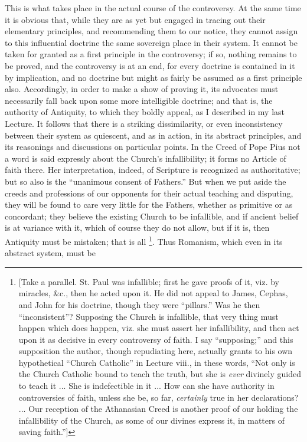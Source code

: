 This is what takes place in the actual course of the controversy.
At the same time it is obvious that, while they are as yet but engaged
in tracing out their elementary principles, and recommending them to
our notice, they cannot assign to this influential doctrine the same
sovereign place in their system. It cannot be taken for granted as a
first principle in the controversy; if so, nothing remains to be
proved, and the controversy is at an end, for every doctrine is
contained in it by implication, and no doctrine but might as fairly be
assumed as a first principle also. Accordingly, in order to make a
show of proving it, its advocates must necessarily fall back upon some
more intelligible doctrine; and that is, the authority of Antiquity,
to which they boldly appeal, as I described in my last Lecture. It
follows that there is a striking dissimilarity, or even inconsistency
between their system as quiescent, and as in action, in its abstract
principles, and its reasonings and discussions on particular points.
In the Creed of Pope Pius not a word is said expressly about the
Church's infallibility; it forms no Article of faith there. Her
interpretation, indeed, of Scripture is recognized as authoritative;
but so also is the ``unanimous consent of Fathers.'' But when
we put aside the creeds and professions of our opponents for their
actual teaching and disputing, they will be found to care very little
for the Fathers, whether as primitive or as concordant; they believe
the existing Church to be infallible, and if ancient belief is at
variance with it, which of course they do not allow, but if it is,
then Antiquity must be mistaken; that is all \footnote{[Take a parallel. St. Paul was infallible;
first he gave proofs of it, viz. by miracles, \&c., then he acted
upon it. He did not appeal to James, Cephas, and John for his
doctrine, though they were ``pillars.'' Was he then
``inconsistent''? Supposing the Church is infallible, that
very thing must happen which does happen, viz. she must assert her
infallibility, and then act upon it as decisive in every controversy
of faith. I say ``supposing;'' and this supposition the
author, though repudiating here, actually grants to his own
hypothetical ``Church Catholic'' in Lecture viii., in these
words, ``Not only is the Church Catholic bound to teach the truth,
but she is \emph{ever} divinely guided to teach it ... She is indefectible in
it ... How can she have authority in controversies of faith, unless
she be, so far, \emph{certainly} true in her declarations? ... Our
reception of the Athanasian Creed is another proof of our holding the
infallibility of the Church, as some of our divines express it, in
matters of saving faith.'']}. Thus Romanism, which even in its abstract system, must be
